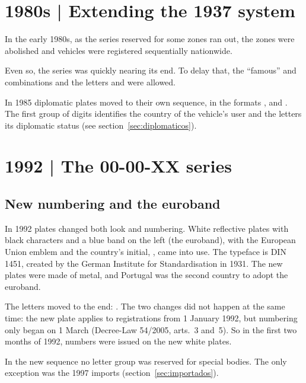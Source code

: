 \section{1980s | Extending the 1937 system}

In the early 1980s, as the series reserved for some zones ran out, the zones were
abolished and vehicles were registered sequentially nationwide.

Even so, the  series was quickly nearing its end. To delay that,
the “famous”  and  combinations and the letters  and
 were allowed.

In 1985 diplomatic plates moved to their own sequence, in the formats
,  and . The first group of
digits identifies the country of the vehicle's user and the letters its
diplomatic status (see section~\ref{sec:diplomaticos}).


\section{1992 | The 00-00-XX series}
\subsection*{New numbering and the euroband}

In 1992 plates changed both look and numbering. White reflective plates with
black characters and a blue band on the left (the euroband), with the European
Union emblem and the country's initial, , came into use. The typeface
is DIN 1451, created by the German Institute for Standardisation in 1931. The new
plates were made of metal, and Portugal was the second country to adopt the
euroband.

The letters moved to the end: . The two changes did not happen at
the same time: the new plate applies to registrations from 1 January 1992, but
 numbering only began on 1 March (Decree-Law 54/2005, arts.~3
and~5). So in the first two months of 1992,  numbers were issued
on the new white plates.

In the new sequence no letter group was reserved for special bodies. The only
exception was the 1997 imports (section~\ref{sec:importados}).



